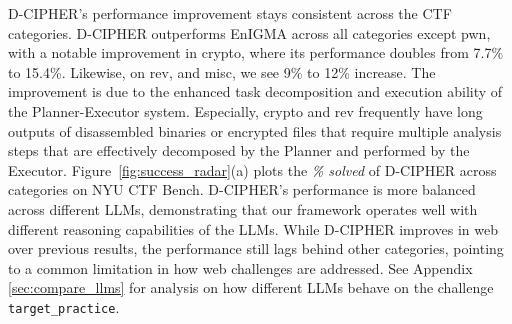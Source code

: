 D-CIPHER's performance improvement stays consistent across the CTF categories.
D-CIPHER outperforms EnIGMA across all categories except pwn, with a notable improvement in crypto, where its performance doubles from 7.7\% to 15.4\%. 
Likewise, on rev, and misc, we see 9\% to 12\% increase. The improvement is due to the enhanced task decomposition and execution ability of the Planner-Executor system. Especially, crypto and rev frequently have long outputs of disassembled binaries or encrypted files that require  multiple analysis steps that are effectively decomposed by the Planner and performed by the Executor.
Figure~\ref{fig:success_radar}(a) plots the \textit{\% solved} of D-CIPHER across categories on NYU CTF Bench. D-CIPHER's performance is more balanced across different LLMs, demonstrating that our framework operates well with different reasoning capabilities of the LLMs. 
While D-CIPHER improves in web over previous results, the performance still lags behind other categories, pointing to a common limitation in how web challenges are addressed. See Appendix \ref{sec:compare_llms} for analysis on how different LLMs behave on the challenge \texttt{target\_practice}.




